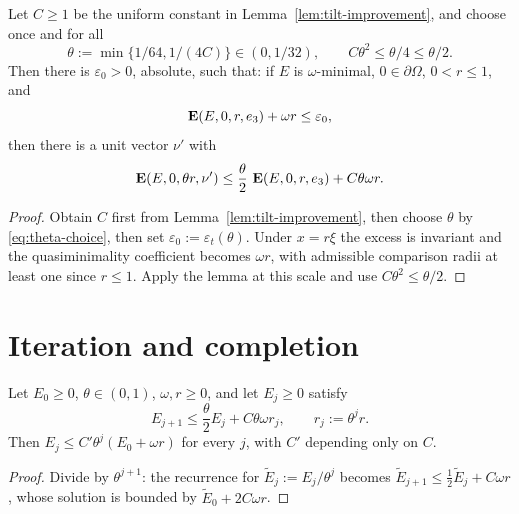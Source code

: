 \begin{corollary}\label{cor:excess-decay}
Let $C\ge1$ be the uniform constant in Lemma~\ref{lem:tilt-improvement}, and
choose once and for all
\begin{equation}\label{eq:theta-choice}
 \theta:=\min\{1/64,1/(4C)\}\in(0,1/32),
 \qquad C\theta^2\le\theta/4\le\theta/2.
\end{equation}
Then there is $\varepsilon_0>0$, absolute, such that: if $E$ is
$\omega$-minimal, $0\in\partial\Omega$, $0<r\le1$, and
\begin{equation}\label{eq:eps-reg-hyp}
  \operatorname{\mathbf E}(E,0,r,e_3)+\omega r\le\varepsilon_0,
\end{equation}
then there is a unit vector $\nu'$ with
\begin{equation}\label{eq:excess-decay}
  \operatorname{\mathbf E}(E,0,\theta r,\nu')
  \le\frac\theta2\,\operatorname{\mathbf E}(E,0,r,e_3)+C\theta\omega r.
\end{equation}
\end{corollary}

\begin{proof}
Obtain $C$ first from Lemma~\ref{lem:tilt-improvement}, then choose
$\theta$ by \eqref{eq:theta-choice}, then set
$\varepsilon_0:=\varepsilon_t(\theta)$.  Under $x=r\xi$ the excess is
invariant and the quasiminimality coefficient becomes $\omega r$, with
admissible comparison radii at least one since $r\le1$.  Apply the lemma
at this scale and use $C\theta^2\le\theta/2$.
\end{proof}

\section{Iteration and completion}\label{sec:eps-completion}

\begin{lemma}\label{lem:geometric-recurrence}
Let $E_0\ge0$, $\theta\in(0,1)$, $\omega,r\ge0$, and let $E_j\ge0$ satisfy
\begin{equation}\label{eq:recurrence}
  E_{j+1}\le\frac\theta2E_j+C\theta\omega r_j,
  \qquad r_j:=\theta^jr .
\end{equation}
Then $E_j\le C'\theta^j(E_0+\omega r)$ for every $j$, with $C'$ depending only
on $C$.
\end{lemma}

\begin{proof}
Divide by $\theta^{j+1}$: the recurrence for $\widetilde E_j:=E_j/\theta^j$
becomes $\widetilde E_{j+1}\le\tfrac12\widetilde E_j+C\omega r$, whose
solution is bounded by $\widetilde E_0+2C\omega r$.
\end{proof}


